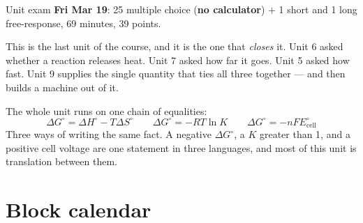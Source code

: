 \documentclass{apchem-worksheet}
\begin{document}
\apctitleblock

\begin{apcnote}
Unit exam \textbf{Fri Mar 19}: 25 multiple choice (\textbf{no calculator})
$+$ 1 short and 1 long free-response, 69 minutes, 39 points.

This is the last unit of the course, and it is the one that \emph{closes}
it. Unit 6 asked whether a reaction releases heat. Unit 7 asked how far it
goes. Unit 5 asked how fast. Unit 9 supplies the single quantity that ties
all three together --- and then builds a machine out of it.

The whole unit runs on one chain of equalities:
\[ \Delta G^\circ = \Delta H^\circ - T\Delta S^\circ
   \qquad \Delta G^\circ = -RT\ln K
   \qquad \Delta G^\circ = -nFE^\circ_{\text{cell}} \]
Three ways of writing the same fact. A negative $\Delta G^\circ$, a $K$
greater than 1, and a positive cell voltage are one statement in three
languages, and most of this unit is translation between them.
\end{apcnote}

\section*{\sffamily Block calendar}
\end{document}
